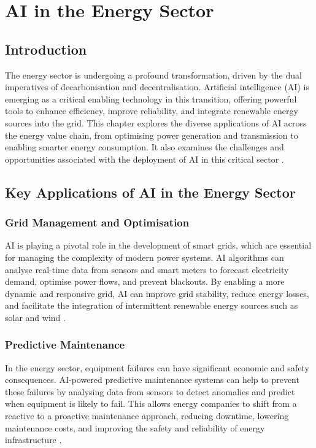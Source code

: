 \chapter{AI in the Energy Sector}
\label{cha:ai_in_the_energy_sector}

\section{Introduction}

The energy sector is undergoing a profound transformation, driven by the dual imperatives of decarbonisation and decentralisation. Artificial intelligence (AI) is emerging as a critical enabling technology in this transition, offering powerful tools to enhance efficiency, improve reliability, and integrate renewable energy sources into the grid. This chapter explores the diverse applications of AI across the energy value chain, from optimising power generation and transmission to enabling smarter energy consumption. It also examines the challenges and opportunities associated with the deployment of AI in this critical sector \parencite{zepter2019review}.

\section{Key Applications of AI in the Energy Sector}

\subsection{Grid Management and Optimisation}

AI is playing a pivotal role in the development of smart grids, which are essential for managing the complexity of modern power systems. AI algorithms can analyse real-time data from sensors and smart meters to forecast electricity demand, optimise power flows, and prevent blackouts. By enabling a more dynamic and responsive grid, AI can improve grid stability, reduce energy losses, and facilitate the integration of intermittent renewable energy sources such as solar and wind \parencite{eera2025artificial}.

\subsection{Predictive Maintenance}

In the energy sector, equipment failures can have significant economic and safety consequences. AI-powered predictive maintenance systems can help to prevent these failures by analysing data from sensors to detect anomalies and predict when equipment is likely to fail. This allows energy companies to shift from a reactive to a proactive maintenance approach, reducing downtime, lowering maintenance costs, and improving the safety and reliability of energy infrastructure \parencite{aliyu2022review}.

